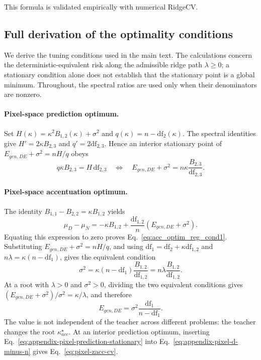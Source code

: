 This formula is validated empirically with numerical RidgeCV.



\begingroup\color{red}
\subsection{Full derivation of the optimality conditions}
\label{app:regularization-derivations}

We derive the tuning conditions used in the main text. The calculations concern
the deterministic-equivalent risk along the admissible ridge path
$\lambda\geq0$; a stationary condition alone does not establish that the
stationary point is a global minimum. Throughout, the spectral ratios are
used only when their denominators are nonzero.

\paragraph{Pixel-space prediction optimum.}
Set $H(\kappa)=\kappa^2B_{1,2}(\kappa)+\sigma^2$ and
$q(\kappa)=n-\mathrm{df}_{2}(\kappa)$. The spectral identities give
$H'=2\kappa B_{2,3}$ and $q'=2\mathrm{df}_{2,3}$. Hence an interior
stationary point of $E_{gen,DE}+\sigma^2=nH/q$ obeys
\begin{equation}
q\kappa B_{2,3}=H\,\mathrm{df}_{2,3}
\quad\Longleftrightarrow\quad
E_{gen,DE}+\sigma^2=n\kappa\frac{B_{2,3}}{\mathrm{df}_{2,3}}.
\label{eq:appendix-pixel-prediction-stationary}
\end{equation}

\paragraph{Pixel-space accentuation optimum.}
The identity $B_{1,1}-B_{2,2}=\kappa B_{1,2}$ yields
\begin{equation}
\mu_D-\mu_N
=-\kappa B_{1,2}+\frac{\mathrm{df}_{1,2}}{n}
(E_{gen,DE}+\sigma^2).
\label{eq:appendix-pixel-d-minus-n}
\end{equation}
Equating this expression to zero proves Eq.~\ref{eq:acc_optim_reg_cond1}.
Substituting $E_{gen,DE}+\sigma^2=nH/q$, and using
$\mathrm{df}_{1}=\mathrm{df}_{2}+\kappa\mathrm{df}_{1,2}$ and
$n\lambda=\kappa(n-\mathrm{df}_{1})$, gives the equivalent condition
\begin{equation}
\sigma^2
=\kappa(n-\mathrm{df}_{1})\frac{B_{1,2}}{\mathrm{df}_{1,2}}
=n\lambda\frac{B_{1,2}}{\mathrm{df}_{1,2}}.
\label{eq:appendix-pixel-control-noise}
\end{equation}
At a root with $\lambda>0$ and $\sigma^2>0$, dividing the two equivalent
conditions gives
$(E_{gen,DE}+\sigma^2)/\sigma^2=\kappa/\lambda$, and therefore
\begin{equation}
E_{gen,DE}=\sigma^2\frac{\mathrm{df}_{1}}{n-\mathrm{df}_{1}}.
\label{eq:appendix-pixel-risk-at-control}
\end{equation}
The value is not independent of the teacher across different problems:
the teacher changes the root $\kappa_{acc}^{\star}$. At an interior
prediction optimum, inserting Eq.~\ref{eq:appendix-pixel-prediction-stationary}
into Eq.~\ref{eq:appendix-pixel-d-minus-n} gives
Eq.~\ref{eq:pixel-zacc-cv}.

